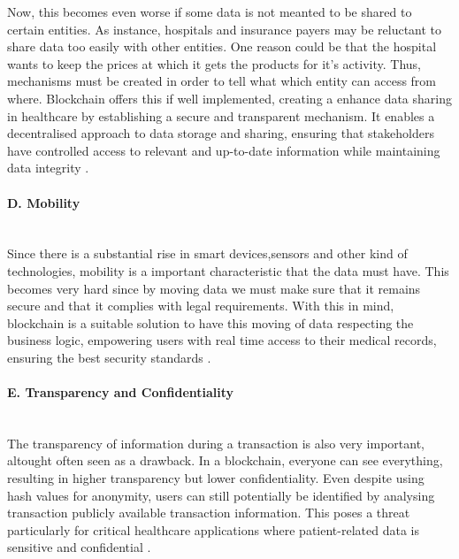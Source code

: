Now, this becomes even worse if some data is not meanted to be shared to certain entities. As instance, hospitals and 
insurance payers may be reluctant to share data too easily with other entities. One reason could be that the hospital 
wants to keep the prices at which it gets the products for it's activity. Thus, mechanisms must be created in order to tell what 
which entity can access from where. Blockchain offers this if well implemented, creating a enhance data sharing in healthcare by 
establishing a secure and transparent mechanism. It enables a decentralised approach to data storage and sharing, ensuring that 
stakeholders have controlled access to relevant and up-to-date information while maintaining data integrity \cite{med-rec}.

\paragraph{D. Mobility} \mbox{}\\
Since there is a substantial rise in smart devices,sensors and other kind of technologies, mobility is a important characteristic 
that the data must have. This becomes very hard since by moving data we must make sure that it remains secure and that it complies 
with legal requirements. With this in mind, blockchain is a suitable solution to have this moving of data respecting the business logic, 
empowering users with real time access to their medical records, ensuring the best security standards \cite{chainmob}. 

\paragraph{E. Transparency and Confidentiality} \mbox{}\\
The transparency of information during a transaction is also very important, altought often seen as a drawback. In a blockchain, 
everyone can see everything, resulting in higher transparency but lower confidentiality. Even  despite using hash values for 
anonymity, users can still potentially be identified by analysing transaction publicly available transaction information. 
This poses a threat particularly for critical healthcare applications where patient-related data is sensitive and 
confidential \cite{confidentiality-and-transparency}.

